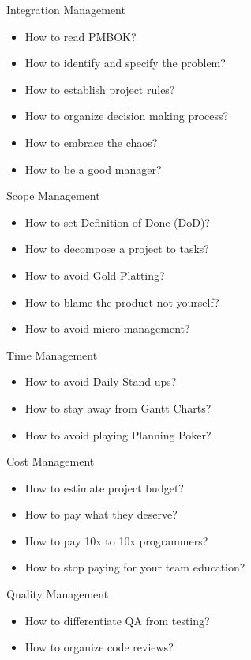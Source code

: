 \documentclass[nobrand,anonymous,nodate,nosecurity]{huawei}
\begin{document}
\begin{lectures}
\item Integration Management
    \begin{itemize}
    \item How to read PMBOK?
    \item How to identify and specify the problem?
    \item How to establish project rules?
    \item How to organize decision making process?
    \item How to embrace the chaos?
    \item How to be a good manager?
    \end{itemize}
\item Scope Management
    \begin{itemize}
    \item How to set Definition of Done (DoD)?
    \item How to decompose a project to tasks?
    \item How to avoid Gold Platting?
    \item How to blame the product not yourself?
    \item How to avoid micro-management?
    \end{itemize}
\item Time Management
    \begin{itemize}
    \item How to avoid Daily Stand-ups?
    \item How to stay away from Gantt Charts?
    \item How to avoid playing Planning Poker?
    \end{itemize}
\item Cost Management
    \begin{itemize}
    \item How to estimate project budget?
    \item How to pay what they deserve?
    \item How to pay 10x to 10x programmers?
    \item How to stop paying for your team education?
    \end{itemize}
\item Quality Management
    \begin{itemize}
    \item How to differentiate QA from testing?
    \item How to organize code reviews?

\end{itemize}
\end{lectures}
\end{document}
